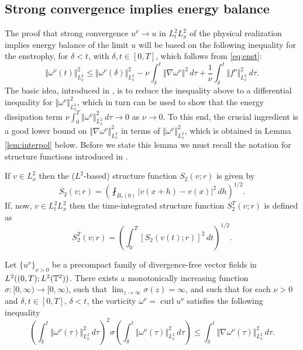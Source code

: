 \documentclass[reqno,12pt]{amsart}
\DeclareMathOperator{\curl}{curl}
\begin{document}
\subsection{Strong convergence implies energy balance}
\label{sec:conv-->ebal}

The proof that strong convergence $u^\nu \to u$ in $L^2_tL^2_x$ of the physical realization implies energy balance of the limit $u$ will be based on the following inequality for the enstrophy, for $\delta < t$, with $\delta,t\in [0,T]$, which follows from \eqref{eq:enst}:
\[
\Vert \omega^\nu(t) \Vert_{L^2_x}^2
\le
\Vert \omega^\nu(\delta) \Vert_{L^2_x}^2
-
\nu \int_\delta^t \Vert \nabla \omega^\nu \Vert^2 \, d\tau
+
\frac{1}{\nu} \int_\delta^t \Vert f^\nu \Vert_{L^2_x}^2 \, d\tau.
\]
The basic idea, introduced in \cite{CLNS2016}, is to reduce the inequality above to a differential inequality for $\Vert \omega^\nu \Vert_{L^2_x}^2$, which in turn can be used to show that the energy dissipation term $\nu \int_0^T \Vert \omega^\nu \Vert_{L^2_x}^2 \, d\tau \to 0$ as $\nu \to 0$. To this end, the crucial ingredient is a good lower bound on $\Vert \nabla \omega^\nu \Vert^2_{L^2_x}$ in terms of $\Vert \omega^\nu \Vert_{L^2_x}^2$, which is obtained in Lemma \ref{lem:interpol} below. Before we state this lemma we must recall the notation for structure functions introduced in \cite{LMPP2021a}.

If $v \in L^2_x$ then the ($L^2$-based) structure function $S_2(v;r)$ is given by
\[S_2(v;r)= \left( \fint_{B_r(0)} |v(x+h)-v(x)|^2 \, dh \right)^{1/2}.\]
If, now, $v \in L^2_tL^2_x$ then the time-integrated structure function $S^T_2(v;r)$ is defined as
\[S^T_2(v;r) = \left(\int_0^T [S_2(v(t);r)]^2 \, dt\right)^{1/2}.\]


\begin{lemma}
\label{lem:interpol}
Let $\{u^\nu\}_{\nu > 0}$ be a precompact family of divergence-free vector fields in $L^2 ((0,T);L^2 (\mathbb{T}^2))$. There exists a monotonically increasing function $\sigma: [0,\infty) \to [0, \infty)$, such that $\lim_{z\to \infty} \sigma(z) = \infty$, and such that for each $\nu >0$ and $\delta,t\in [0,T]$, $\delta < t$, the vorticity $\omega^\nu = \curl  u^\nu $ satisfies the following inequality
\[
\left(
\int_\delta^t \Vert \omega^\nu(\tau) \Vert_{L^2_x}^2 \, d\tau
\right)^2
\sigma\left(
\int_\delta^t \Vert \omega^\nu(\tau) \Vert_{L^2_x}^2 \, d\tau
\right)
\le
\int_\delta^t \Vert \nabla \omega^\nu(\tau) \Vert_{L^2_x}^2 \, d\tau.
\]
\end{lemma}
\end{document}
